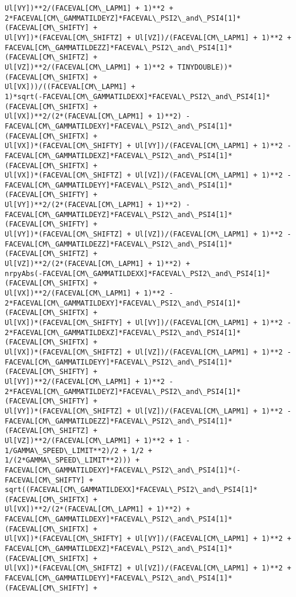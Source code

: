 \documentclass[landscape,letterpaper,10pt,english]{article}
\begin{document}
\begin{Verbatim}[commandchars=\\\{\}]
Ul[VY])**2/(FACEVAL[CM\_LAPM1] + 1)**2 +
2*FACEVAL[CM\_GAMMATILDEYZ]*FACEVAL\_PSI2\_and\_PSI4[1]*(FACEVAL[CM\_SHIFTY] +
Ul[VY])*(FACEVAL[CM\_SHIFTZ] + Ul[VZ])/(FACEVAL[CM\_LAPM1] + 1)**2 +
FACEVAL[CM\_GAMMATILDEZZ]*FACEVAL\_PSI2\_and\_PSI4[1]*(FACEVAL[CM\_SHIFTZ] +
Ul[VZ])**2/(FACEVAL[CM\_LAPM1] + 1)**2 + TINYDOUBLE))*(FACEVAL[CM\_SHIFTX] +
Ul[VX]))/((FACEVAL[CM\_LAPM1] +
1)*sqrt(-FACEVAL[CM\_GAMMATILDEXX]*FACEVAL\_PSI2\_and\_PSI4[1]*(FACEVAL[CM\_SHIFTX] +
Ul[VX])**2/(2*(FACEVAL[CM\_LAPM1] + 1)**2) -
FACEVAL[CM\_GAMMATILDEXY]*FACEVAL\_PSI2\_and\_PSI4[1]*(FACEVAL[CM\_SHIFTX] +
Ul[VX])*(FACEVAL[CM\_SHIFTY] + Ul[VY])/(FACEVAL[CM\_LAPM1] + 1)**2 -
FACEVAL[CM\_GAMMATILDEXZ]*FACEVAL\_PSI2\_and\_PSI4[1]*(FACEVAL[CM\_SHIFTX] +
Ul[VX])*(FACEVAL[CM\_SHIFTZ] + Ul[VZ])/(FACEVAL[CM\_LAPM1] + 1)**2 -
FACEVAL[CM\_GAMMATILDEYY]*FACEVAL\_PSI2\_and\_PSI4[1]*(FACEVAL[CM\_SHIFTY] +
Ul[VY])**2/(2*(FACEVAL[CM\_LAPM1] + 1)**2) -
FACEVAL[CM\_GAMMATILDEYZ]*FACEVAL\_PSI2\_and\_PSI4[1]*(FACEVAL[CM\_SHIFTY] +
Ul[VY])*(FACEVAL[CM\_SHIFTZ] + Ul[VZ])/(FACEVAL[CM\_LAPM1] + 1)**2 -
FACEVAL[CM\_GAMMATILDEZZ]*FACEVAL\_PSI2\_and\_PSI4[1]*(FACEVAL[CM\_SHIFTZ] +
Ul[VZ])**2/(2*(FACEVAL[CM\_LAPM1] + 1)**2) +
nrpyAbs(-FACEVAL[CM\_GAMMATILDEXX]*FACEVAL\_PSI2\_and\_PSI4[1]*(FACEVAL[CM\_SHIFTX] +
Ul[VX])**2/(FACEVAL[CM\_LAPM1] + 1)**2 -
2*FACEVAL[CM\_GAMMATILDEXY]*FACEVAL\_PSI2\_and\_PSI4[1]*(FACEVAL[CM\_SHIFTX] +
Ul[VX])*(FACEVAL[CM\_SHIFTY] + Ul[VY])/(FACEVAL[CM\_LAPM1] + 1)**2 -
2*FACEVAL[CM\_GAMMATILDEXZ]*FACEVAL\_PSI2\_and\_PSI4[1]*(FACEVAL[CM\_SHIFTX] +
Ul[VX])*(FACEVAL[CM\_SHIFTZ] + Ul[VZ])/(FACEVAL[CM\_LAPM1] + 1)**2 -
FACEVAL[CM\_GAMMATILDEYY]*FACEVAL\_PSI2\_and\_PSI4[1]*(FACEVAL[CM\_SHIFTY] +
Ul[VY])**2/(FACEVAL[CM\_LAPM1] + 1)**2 -
2*FACEVAL[CM\_GAMMATILDEYZ]*FACEVAL\_PSI2\_and\_PSI4[1]*(FACEVAL[CM\_SHIFTY] +
Ul[VY])*(FACEVAL[CM\_SHIFTZ] + Ul[VZ])/(FACEVAL[CM\_LAPM1] + 1)**2 -
FACEVAL[CM\_GAMMATILDEZZ]*FACEVAL\_PSI2\_and\_PSI4[1]*(FACEVAL[CM\_SHIFTZ] +
Ul[VZ])**2/(FACEVAL[CM\_LAPM1] + 1)**2 + 1 - 1/GAMMA\_SPEED\_LIMIT**2)/2 + 1/2 +
1/(2*GAMMA\_SPEED\_LIMIT**2))) +
FACEVAL[CM\_GAMMATILDEXY]*FACEVAL\_PSI2\_and\_PSI4[1]*(-FACEVAL[CM\_SHIFTY] +
sqrt((FACEVAL[CM\_GAMMATILDEXX]*FACEVAL\_PSI2\_and\_PSI4[1]*(FACEVAL[CM\_SHIFTX] +
Ul[VX])**2/(2*(FACEVAL[CM\_LAPM1] + 1)**2) +
FACEVAL[CM\_GAMMATILDEXY]*FACEVAL\_PSI2\_and\_PSI4[1]*(FACEVAL[CM\_SHIFTX] +
Ul[VX])*(FACEVAL[CM\_SHIFTY] + Ul[VY])/(FACEVAL[CM\_LAPM1] + 1)**2 +
FACEVAL[CM\_GAMMATILDEXZ]*FACEVAL\_PSI2\_and\_PSI4[1]*(FACEVAL[CM\_SHIFTX] +
Ul[VX])*(FACEVAL[CM\_SHIFTZ] + Ul[VZ])/(FACEVAL[CM\_LAPM1] + 1)**2 +
FACEVAL[CM\_GAMMATILDEYY]*FACEVAL\_PSI2\_and\_PSI4[1]*(FACEVAL[CM\_SHIFTY] +

\end{Verbatim}
\end{document}
